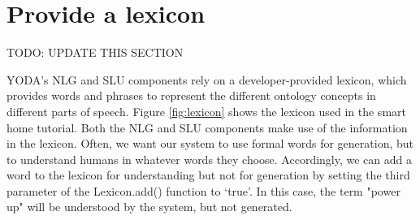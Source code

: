 \documentclass[titlepage]{article}
\begin{document}
\section{Provide a lexicon}

TODO: UPDATE THIS SECTION


YODA's NLG and SLU components rely on a developer-provided lexicon, which provides words and phrases to represent the different ontology concepts in different parts of speech.
Figure \ref{fig:lexicon} shows the lexicon used in the smart home tutorial.
Both the NLG and SLU components make use of the information in the lexicon.
Often, we want our system to use formal words for generation, but to understand humans in whatever words they choose.
Accordingly, we can add a word to the lexicon for understanding but not for generation by setting the third parameter of the Lexicon.add() function to `true'.
In this case, the term "power up" will be understood by the system, but not generated.
\end{document}
